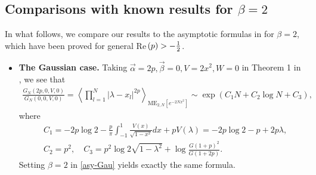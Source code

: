 \documentclass[11pt,a4paper]{article}
\numberwithin{equation}{section} %
\theoremstyle{plain}
\theoremstyle{definition}
\numberwithin{prop}{section}
\numberwithin{cor}{section}
\numberwithin{remark}{section}
\begin{document}
\subsection*{Comparisons with known results for $\beta = 2$}
In what follows, we compare our results to the asymptotic formulas in \cite{CG21} for $\beta=2$,
which have been proved for general Re$\,(p) > - {1 \over 2}$.
\begin{itemize}
    \item \textbf{The Gaussian case.} Taking $\vec{\alpha}=2p,\vec{\beta}=0,V=2x^2,W=0$ in Theorem 1 in \cite{CG21}, we see that
    \begin{align}
        \frac{G_N(2p,0,V,0)}{G_N(0,0,V,0)}=\left\langle\prod_{l=1}^N |\lambda-x_l|^{2 p}\right\rangle_{\mathrm{ME}_{2, N}\left[e^{-2N x^2}\right]}\sim \exp(C_1N+C_2\log N+C_3),
    \end{align}
    where
    \begin{align}
        &C_1=-2p\log2-\frac{p}{\pi}\int_{-1}^{1}\frac{V(x)}{\sqrt{1-x^2}}dx+pV(\lambda)=-2p\log2-p+2p\lambda,\\
        &C_2=p^2,\quad C_3=p^2\log2\sqrt{1-\lambda^2}+\log\frac{G(1+p)^2}{G(1+2p)}.
    \end{align}
    Setting $\beta=2$ in \eqref{asy-Gau} yields exactly the same formula. 
    

\end{itemize}
\end{document}
